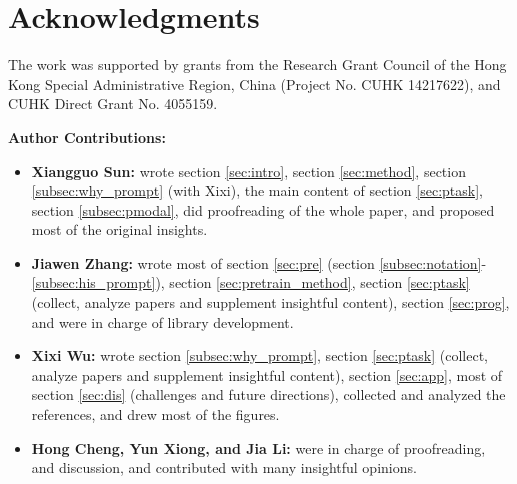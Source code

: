 \section*{Acknowledgments}

The work was supported by grants from the Research Grant Council of the Hong Kong Special Administrative Region, China (Project No. CUHK 14217622), and CUHK Direct Grant No. 4055159.  

\noindent \textbf{Author Contributions:} 
\vspace*{-0.5\baselineskip} 
\begin{itemize}
    \item \textbf{Xiangguo Sun:} wrote section \ref{sec:intro}, section \ref{sec:method}, section \ref{subsec:why_prompt} (with Xixi), the main content of section \ref{sec:ptask}, section \ref{subsec:pmodal}, did proofreading of the whole paper, and proposed most of the original insights.
    \item \textbf{Jiawen Zhang:} wrote most of section \ref{sec:pre} (section \ref{subsec:notation}-\ref{subsec:his_prompt}), section \ref{sec:pretrain_method}, section \ref{sec:ptask}(collect, analyze papers and supplement insightful content), section \ref{sec:prog}, and were in charge of library development.
    \item \textbf{Xixi Wu:} wrote section \ref{subsec:why_prompt}, section \ref{sec:ptask} (collect, analyze papers and supplement insightful content), section \ref{sec:app}, most of section \ref{sec:dis} (challenges and future directions), collected and analyzed the references, and drew most of the figures.  
    \item \textbf{Hong Cheng,  Yun Xiong, and Jia Li:} were in charge of proofreading, and discussion, and contributed with many insightful opinions.
\end{itemize}